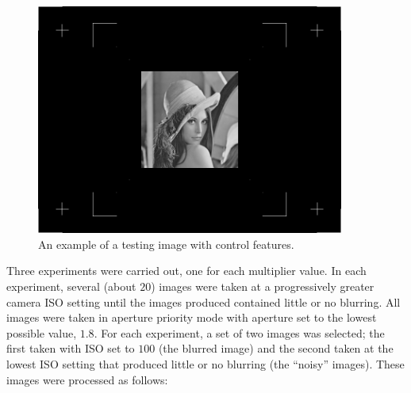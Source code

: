 \documentclass[12pt,notitlepage]{report}
\begin{document}
\begin{figure}[h]
 \centering
  \includegraphics[width=0.9\textwidth]{testing_image_control_points.png}
 \caption[An example of a testing image with control features]{An example of a testing image with control features.}
 \label{fig:testing_image_control_points}
\end{figure}

Three experiments were carried out, one for each multiplier value. In each experiment, several (about $20$) images were taken at a progressively greater camera ISO setting until the images produced contained little or no blurring. All images were taken in aperture priority mode with aperture set to the lowest possible value, $1.8$. For each experiment, a set of two images was selected; the first taken with ISO set to $100$ (the blurred image) and the second taken at the lowest ISO setting that produced little or no blurring (the ``noisy'' images). These images were processed as follows: 
\end{document}
